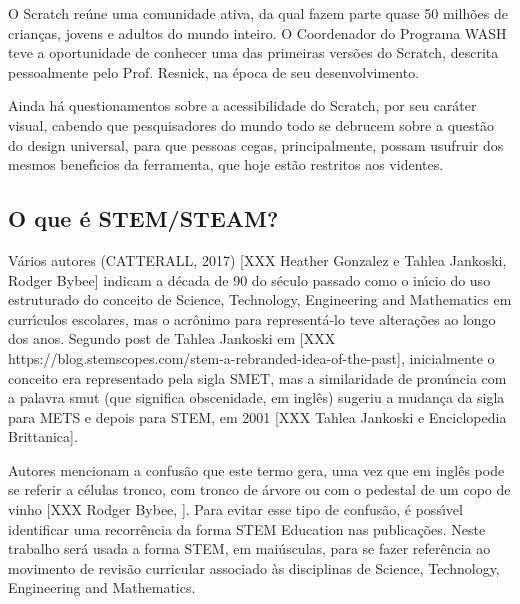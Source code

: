 \documentclass[
12pt,		%
openright,	%
twoside,  %
a4paper,			%
chapter=TITLE,		%
english,			%
french,				%
spanish,			%
brazil				%
]{USPSC-classe/USPSC}
\begin{document}
O Scratch re\'une uma comunidade ativa, da qual fazem parte quase 50 milh\~oes de crian\c{c}as, jovens e adultos do mundo inteiro. O Coordenador do Programa WASH teve a oportunidade de conhecer uma das primeiras vers\~oes do Scratch, descrita pessoalmente pelo Prof. Resnick, na \'epoca de seu desenvolvimento.









Ainda h\'a questionamentos sobre a acessibilidade do Scratch, por seu car\'ater visual, cabendo que pesquisadores do mundo todo se debrucem sobre a quest\~ao do design universal, para que pessoas cegas, principalmente, possam usufruir dos mesmos benef\'{\i}cios da ferramenta, que hoje est\~ao restritos aos videntes.









\subsection[O que \'e STEM/STEAM?]{O que \'e STEM/STEAM?}\label{O que \'e STEM/STEAM?}
V\'arios autores  (CATTERALL, 2017)  [XXX Heather Gonzalez e  Tahlea Jankoski, Rodger Bybee] indicam a d\'ecada de 90 do s\'eculo passado como o in\'{\i}cio do uso estruturado do conceito de Science, Technology, Engineering and Mathematics em curr\'{\i}culos escolares, mas o acr\^onimo para represent\'a-lo teve altera\c{c}\~oes ao longo dos anos. Segundo post de Tahlea Jankoski em [XXX https://blog.stemscopes.com/stem-a-rebranded-idea-of-the-past], inicialmente o conceito era representado pela sigla SMET, mas a similaridade de pron\'uncia com a palavra \textquotedbl smut (que significa obscenidade, em ingl\^es) sugeriu a mudan\c{c}a da sigla para METS e depois para STEM, em 2001 [XXX Tahlea Jankoski e Enciclopedia Brittanica].









Autores mencionam a confus\~ao que este termo gera, uma vez que em ingl\^es pode se referir a c\'elulas tronco, com tronco de \'arvore ou com o pedestal de um copo de vinho [XXX Rodger Bybee, ]. Para evitar esse tipo de confus\~ao, \'e poss\'{\i}vel identificar uma recorr\^encia da forma \textquotedbl STEM Education nas publica\c{c}\~oes. Neste trabalho ser\'a usada a forma STEM, em mai\'usculas, para se fazer refer\^encia ao movimento de revis\~ao curricular associado \`as disciplinas de \textquotedbl Science, Technology, Engineering and Mathematics.  
\end{document}
